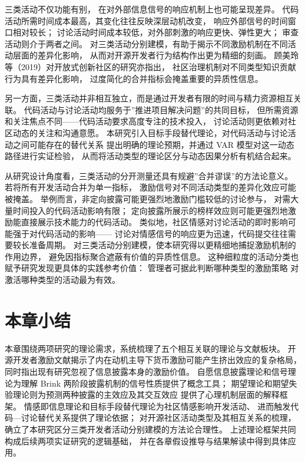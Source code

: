 三类活动不仅功能有别，
在对外部信息信号的响应机制上也可能呈现差异。
代码活动所需时间成本最高，其变化往往反映深层动机改变，
响应外部信号的时间窗口相对较长；
讨论活动时间成本较低，对外部刺激的响应更快、弹性更大；
审查活动则介于两者之间。
对三类活动分别建模，有助于揭示不同激励机制在不同活动层面的差异化影响，
从而对开源开发者行为结构作出更为精细的刻画\cite{schroter2010}。
顾美玲等（2019）对开放式创新社区的研究亦指出，
社区治理机制对不同类型知识贡献行为具有差异化影响，
过度简化的合并指标会掩盖重要的异质性信息\cite{gu2019governance}。

另一方面，三类活动并非相互独立，而是通过开发者有限的时间与精力资源相互关联。
代码活动与讨论活动均服务于”推进项目解决问题”的共同目标，
但所需资源和关注焦点不同——代码活动要求高度专注的技术投入，
讨论活动则更依赖对社区动态的关注和沟通意愿。
本研究引入目标手段替代理论，对代码活动与讨论活动之间可能存在的替代关系
提出明确的理论预期，并通过 VAR 模型对这一动态路径进行实证检验，
从而将活动类型的理论区分与动态因果分析有机结合起来。

从研究设计角度看，三类活动的分开测量还具有规避”合并谬误”的方法论意义。
若将所有开发活动合并为单一指标，
激励信号对不同活动类型的差异化效应可能被掩盖。
举例而言，非定向披露可能更强烈地激励门槛较低的讨论参与，
对需大量时间投入的代码活动影响有限；
定向披露所展示的榜样效应则可能更强烈地激励能直接展示技术能力的代码活动。
类似地，社区情感对讨论活动的即时影响可能强于对代码活动的影响——
讨论对情感信号的响应更为迅速，代码提交往往需要较长准备周期。
对三类活动分别建模，使本研究得以更精细地捕捉激励机制的作用边界，
避免因指标聚合遮蔽有价值的异质性信息。
这种细粒度的活动分类也赋予研究发现更具体的实践参考价值：
管理者可据此判断哪种类型的激励策略
对激活哪种类型的活动最为有效。

\section{本章小结}

本章围绕两项研究的理论需求，系统梳理了五个相互关联的理论与文献板块。
开源开发者激励文献揭示了内在动机主导下货币激励可能产生挤出效应的复杂格局，
同时指出现有研究忽视了信息披露本身的激励价值。
自愿信息披露理论和信号理论为理解 Brink 两阶段披露机制的信号性质提供了概念工具；
期望理论和期望失验理论则为预测两种披露的主效应及其交互效应
提供了心理机制层面的解释框架。
情感即信息理论和目标手段替代理论为社区情感影响开发活动、
进而触发代码—讨论替代关系提供了理论依据；
对开源社区活动类型及其相互关系的梳理，
确立了本研究区分三类开发者活动分别建模的方法论合理性。
上述理论框架共同构成后续两项实证研究的逻辑基础，
并在各章假设推导与结果解读中得到具体应用。


